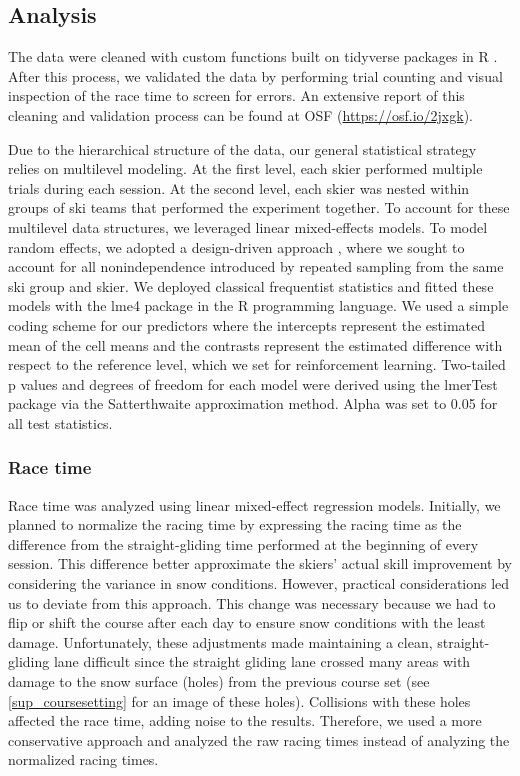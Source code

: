 \documentclass[pdflatex,sn-mathphys-num]{sn-jnl}%
\theoremstyle{thmstyleone}%
\theoremstyle{thmstyletwo}%
\theoremstyle{thmstylethree}%
\begin{document}
\subsection{Analysis}
The data were cleaned with custom functions built on tidyverse \cite{wickham_welcome_2019} packages in R \cite{r_core_team_r_2022}. After this process, we validated the data by performing trial counting and visual inspection of the race time to screen for errors. An extensive report of this cleaning and validation process can be found at OSF  (\url{https://osf.io/2jxgk}).

Due to the hierarchical structure of the data, our general statistical strategy relies on multilevel modeling. At the first level, each skier performed multiple trials during each session. At the second level, each skier was nested within groups of ski teams that performed the experiment together. To account for these multilevel data structures, we leveraged linear mixed-effects models. To model random effects, we adopted a design-driven approach \cite{barr_random_2013, barr_learning_2021}, where we sought to account for all nonindependence introduced by repeated sampling from the same ski group and skier. We deployed classical frequentist statistics and fitted these models with the lme4 package \cite{bates_fitting_2015} in the R programming language. We used a simple coding scheme for our predictors where the intercepts represent the estimated mean of the cell means and the contrasts represent the estimated difference with respect to the reference level, which we set for reinforcement learning. Two-tailed p values and degrees of freedom for each model were derived using the lmerTest package \cite{kuznetsova_lmertest_2017} via the Satterthwaite approximation method. Alpha was set to 0.05 for all test statistics.

 \subsubsection{Race time}

Race time was analyzed using linear mixed-effect regression models. Initially, we planned to normalize the racing time by expressing the racing time as the difference from the straight-gliding time performed at the beginning of every session. This difference better approximate the skiers' actual skill improvement by considering the variance in snow conditions. However, practical considerations led us to deviate from this approach. This change was necessary because we had to flip or shift the course after each day to ensure snow conditions with the least damage. Unfortunately, these adjustments made maintaining a clean, straight-gliding lane difficult since the straight gliding lane crossed many areas with damage to the snow surface (holes) from the previous course set (see \ref{sup_coursesetting} for an image of these holes). Collisions with these holes affected the race time, adding noise to the results. Therefore, we used a more conservative approach and analyzed the raw racing times instead of analyzing the normalized racing times.
\end{document}
